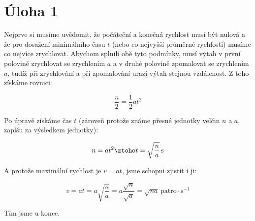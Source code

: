 \documentclass{fkssolpub}
\author{Ondřej Sedláček}
\begin{document}
 

\section{Úloha 1}

Nejprve si musíme uvědomit, že počáteční a konečná rychlost musí být nulová a
že pro dosažení minimálního času $t$ (nebo co nejvyšší průměrné rychlosti)
musíme co nejvíce zrychlovat. Abychom splnili obě tyto podmínky, musí výtah
v první polovině zrychlovat se zrychlením $a$ a v druhé polovině
zpomalovat se zrychlením $a$, tudíž při zrychlování a při zpomalování urazí
výtah stejnou vzdálenost. Z toho získáme rovnici:

\[
  \frac{n}{2} = \frac{1}{2} a t^2
\]

Po úpravě získáme čas $t$ (zároveň protože známe přesné jednotky velčin
$n$ a $a$, zapíšu za výsledkem jednotky):

\[
  n = a t^2 \ztoho t = \sqrt{\frac{n}{a}} \, \text{s}
\]

A protože maximální rychlost je $v = a t$, jsme schopni zjistit
i ji:

\[
  v = a t = a \sqrt{\frac{n}{a}} = a \frac{\sqrt{n}}{\sqrt{a}}
    = \sqrt{n a} \, \text{patro} \cdot \text{s}^{-1}
\]

Tím jsme u konce.
\end{document}
